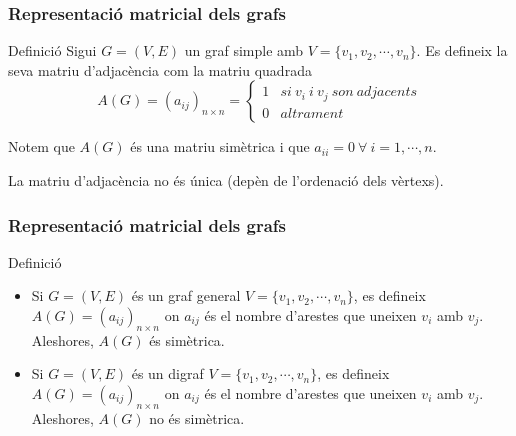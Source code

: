 \documentclass{beamer}
\begin{document}
\begin{frame}
\frametitle{Representació matricial dels grafs}
\begin{block}{Definició}
Sigui $G=(V,E)$ un graf simple amb $V=\{v_1,v_2,\cdots,v_n\}$. Es defineix la seva matriu d'adjacència com  la matriu quadrada
\[A(G) = (a_{ij})_{n\times n} = \left\{\begin{array}{ll}1 & si\ v_i\ i\ v_j\ son\ adjacents \\0 & altrament\end{array}\right.\]

\end{block}
Notem que $A(G)$ és una matriu simètrica i que $a_{ii} = 0\ \forall\ i=1,\cdots,n$.

La matriu d'adjacència no és única (depèn de l'ordenació dels vèrtexs). 
\end{frame}


\begin{frame}
\frametitle{Representació matricial dels grafs}
\begin{block}{Definició}
\begin{itemize}
\item Si $G=(V,E)$ és un graf general $V=\{v_1,v_2,\cdots,v_n\}$, es defineix $A(G) = (a_{ij})_{n\times n}$ on $a_{ij}$ és el nombre d'arestes que uneixen $v_i$ amb $v_j$. Aleshores, $A(G)$ és simètrica.
\item Si $G=(V,E)$ és un digraf $V=\{v_1,v_2,\cdots,v_n\}$, es defineix $A(G) = (a_{ij})_{n\times n}$ on $a_{ij}$ és el nombre d'arestes que uneixen $v_i$ amb $v_j$. Aleshores, $A(G)$ no és simètrica.

\end{itemize}
\end{block}
\end{frame}
\end{document}
